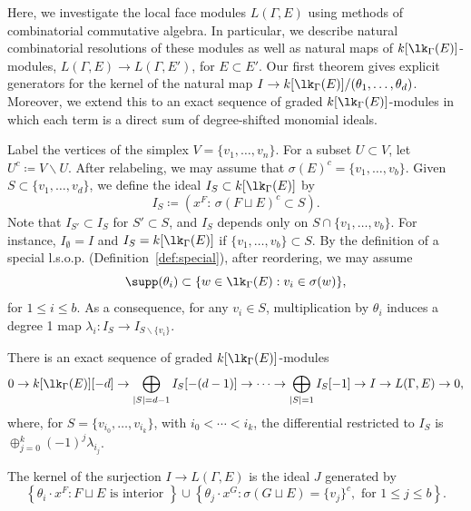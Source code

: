  

Here, we investigate the local face modules $L(\Gamma, E)$ using methods of combinatorial commutative algebra. In particular, we describe natural combinatorial resolutions of these modules as well as natural maps of $k[\lk_\Gamma(E)]$-modules, $L(\Gamma,E) \to L(\Gamma, E')$, for $E \subset E'$.  Our first theorem gives explicit generators for the kernel of the natural map $I \to k[\lk_\Gamma(E)]/(\theta_1, \ldots, \theta_d)$. Moreover, we extend this to an exact sequence of graded $k[\lk_\Gamma(E)]$-modules in which each term is a direct sum of degree-shifted monomial ideals.

Label the vertices of the simplex $V = \{ v_1, \ldots, v_n \}$.  For a subset $U \subset V$, let $U^c  \coloneqq  V \smallsetminus U$. After relabeling, we may assume that $\sigma(E)^c = \{v_1, \ldots, v_b\}$. Given $S \subset \{v_1, \ldots, v_d\}$, 
we define the ideal $I_S \subset k[\lk_\Gamma(E)]$ by
\begin{equation*}
I_S  \coloneqq  ( x^F : \, \sigma(F \sqcup E)^c \subset S). 
\end{equation*}
Note that $I_{S'} \subset I_{S}$ for $S' \subset S$, and $I_S$ depends only on $S \cap \{v_1, \ldots, v_b\}$. For instance, $I_{\emptyset} = I$ and $I_{S} = k[\lk_{\Gamma}(E)]$ if $\{v_1, \ldots, v_b \} \subset S$. By the definition of a special l.s.o.p. (Definition~\ref{def:special}), after reordering, we may assume
\[
\supp(\theta_i) \subset \{ w \in \lk_\Gamma(E) : v_i \in \sigma(w) \}, 
\]
for $1 \leq i \leq b$.  As a consequence, for any $v_i \in S$, multiplication by $\theta_i$ induces a degree 1 map $\lambda_i \colon I_S \to I_{S \smallsetminus \{v_i\}}$.

\begin{theorem}\label{thm:resolution}
There is an exact sequence of graded $k[\lk_{\Gamma}(E)]$-modules
 $$0  \to k[\lk_{\Gamma}(E)][-d] \to \bigoplus_{ |S|  = d - 1 } I_{S}[-(d-1)] \to \dotsb  \to \bigoplus_{|S| = 1} I_{S}[-1] \to I \to L(\Gamma,E) \to 0,$$
where,  
for $S= \{v_{i_0}, \ldots, v_{i_k}\}$, with $i_0 < \cdots < i_k$, the differential restricted to $I_S$ is $\oplus_{j = 0}^k (-1)^j \lambda_{i_j}$.
\end{theorem}

\begin{corollary}\label{cor:presentation}
The kernel of the surjection $I \to L(\Gamma, E)$ is the ideal $J$ generated by 
 $$ \left \{ \theta_i \cdot x^{F} : F \sqcup E \mbox{ is interior } \right \}  \cup  \left \{ \theta_{j} \cdot x^G : \sigma(G \sqcup E) = \{v_j\}^c, \mbox{ for } 1 \leq j \leq b \right \}.$$
\end{corollary}

